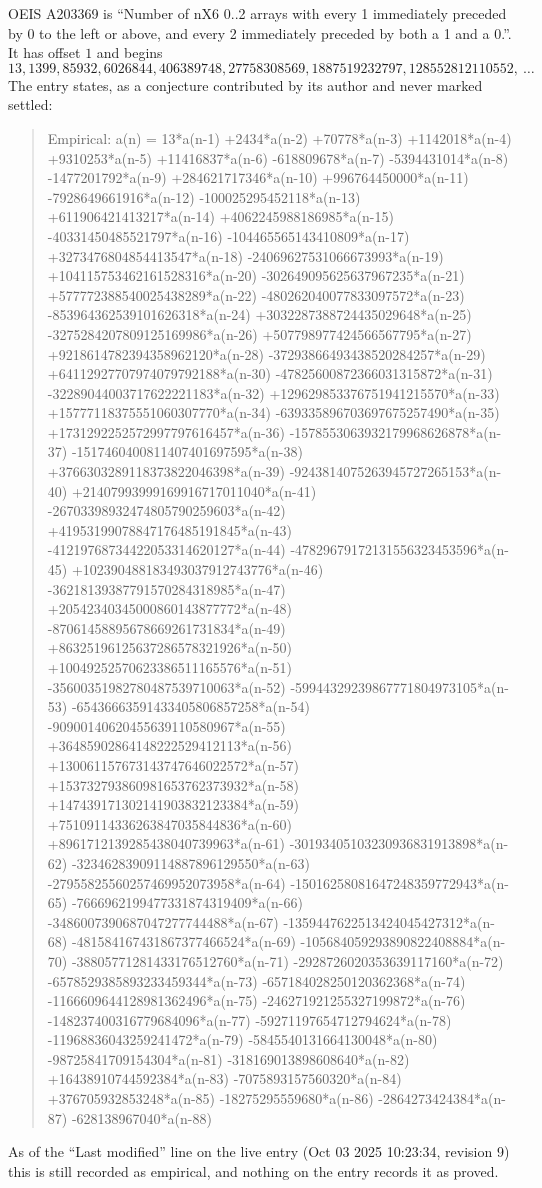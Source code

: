 \documentclass[11pt,a4paper]{article}
\theoremstyle{plain}
\theoremstyle{definition}
\begin{document}
OEIS A203369 is ``Number of nX6 0..2 arrays with every 1 immediately preceded by 0 to the left or above, and every 2 immediately preceded by both a 1 and a 0.''. It has offset $1$ and begins
\[
13, 1399, 85932, 6026844, 406389748, 27758308569, 1887519232797, 128552812110552,\ \dots
\]
The entry states, as a conjecture contributed by its author and never marked settled:
\begin{quote}
Empirical: a(n) = 13*a(n-1) +2434*a(n-2) +70778*a(n-3) +1142018*a(n-4) +9310253*a(n-5) +11416837*a(n-6) -618809678*a(n-7) -5394431014*a(n-8) -1477201792*a(n-9) +284621717346*a(n-10) +996764450000*a(n-11) -7928649661916*a(n-12) -100025295452118*a(n-13) +611906421413217*a(n-14) +4062245988186985*a(n-15) -40331450485521797*a(n-16) -104465565143410809*a(n-17) +3273476804854413547*a(n-18) -24069627531066673993*a(n-19) +104115753462161528316*a(n-20) -302649095625637967235*a(n-21) +577772388540025438289*a(n-22) -480262040077833097572*a(n-23) -853964362539101626318*a(n-24) +3032287388724435029648*a(n-25) -3275284207809125169986*a(n-26) +507798977424566567795*a(n-27) +9218614782394358962120*a(n-28) -37293866493438520284257*a(n-29) +64112927707974079792188*a(n-30) -47825600872366031315872*a(n-31) -32289044003717622221183*a(n-32) +129629853376751941215570*a(n-33) +15777118375551060307770*a(n-34) -639335896703697675257490*a(n-35) +1731292252572997797616457*a(n-36) -1578553063932179968626878*a(n-37) -1517460400811407401697595*a(n-38) +3766303289118373822046398*a(n-39) -9243814075263945727265153*a(n-40) +21407993999169916717011040*a(n-41) -26703398932474805790259603*a(n-42) +41953199078847176485191845*a(n-43) -41219768734422053314620127*a(n-44) -47829679172131556323453596*a(n-45) +102390488183493037912743776*a(n-46) -36218139387791570284318985*a(n-47) +20542340345000860143877772*a(n-48) -87061458895678669261731834*a(n-49) +86325196125637286578321926*a(n-50) +10049252570623386511165576*a(n-51) -35600351982780487539710063*a(n-52) -59944329239867771804973105*a(n-53) -65436663591433405806857258*a(n-54) -90900140620455639110580967*a(n-55) +36485902864148222529412113*a(n-56) +130061157673143747646022572*a(n-57) +153732793860981653762373932*a(n-58) +147439171302141903832123384*a(n-59) +75109114336263847035844836*a(n-60) +8961712139285438040739963*a(n-61) -30193405103230936831913898*a(n-62) -32346283909114887896129550*a(n-63) -27955825560257469952073958*a(n-64) -15016258081647248359772943*a(n-65) -7666962199477331874319409*a(n-66) -3486007390687047277744488*a(n-67) -1359447622513424045427312*a(n-68) -481584167431867377466524*a(n-69) -105684059293890822408884*a(n-70) -38805771281433176512760*a(n-71) -2928726020353639117160*a(n-72) -6578529385893233459344*a(n-73) -657184028250120362368*a(n-74) -1166609644128981362496*a(n-75) -246271921255327199872*a(n-76) -148237400316779684096*a(n-77) -59271197654712794624*a(n-78) -11968836043259241472*a(n-79) -5845540131664130048*a(n-80) -98725841709154304*a(n-81) -318169013898608640*a(n-82) +16438910744592384*a(n-83) -7075893157560320*a(n-84) +376705932853248*a(n-85) -18275295559680*a(n-86) -2864273424384*a(n-87) -628138967040*a(n-88)
\end{quote}
As of the ``Last modified'' line on the live entry (Oct 03 2025 10:23:34, revision 9) this is still
recorded as empirical, and nothing on the entry records it as proved.
\end{document}
